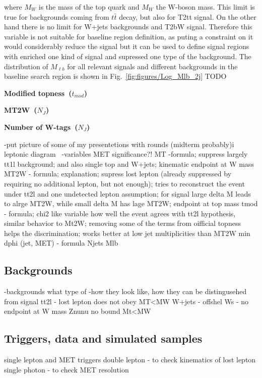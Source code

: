 where $M_{W}$ is the mass of the top quark and $M_{W}$ the W-boson mass. This limit is true for backgrounds coming from $t\bar{t}$ decay, but also for T2tt signal. On the other hand there is no limit for W+jets backgrounds and T2bW signal. Therefore this variable is not suitable for baseline region definition, as puting a constraint on it would considerably reduce the signal but it can be used to define signal regions with enriched one kind of signal and supressed one type of the background. The distribution of  $M_{\ell b}$ for all relevant signals and different backgrounds in the baseline search region is shown in Fig.~\ref{fig:figures/Log_Mlb_2j} TODO

\textbf{Modified topness~($t_{mod}$)}

\textbf{MT2W~($N_{J}$)}

\textbf{Number of W-tags~($N_{J}$)}

-put picture of some of my presentetions with rounds (midterm probably)i
leptonic diagram~\cite{CMS:2016vew}
-variables
	MET significance?!
	MT -formula; suppress largely tt1l background; and also single top and W+jets; kinematic endpoint at W mass
	MT2W - formula; explanation; supress lost lepton (already suppressed by requiring no additional lepton, but not enough); tries to reconstruct the event under tt2l and one undetected lepton assumption; for signal large delta M leads to alrge MT2W, while small delta M has lage MT2W; endpoint at top mass
	tmod - formula; chi2 like variable how well the event agrees with tt2l hypothesis, similar behavior to Mt2W; removing some of the terms from oifficial topness helps the discrimination; works better at low jet multiplicities than MT2W
	min dphi (jet, MET) - formula
        Njets
	Mlb

\subsection{Backgrounds}
-backgrounds 
	what type of
-how they look like, how they can be distingusehed from signal
	tt2l - lost lepton does not obey MT<MW
	W+jets - offshel Ws - no endpoint at W mass
	Znunu no bound Mt<MW

\subsection{Triggers, data and simulated samples}

	single lepton and MET triggers
	double lepton - to check kinematics of lost lepton
	single photon - to check MET resolution

